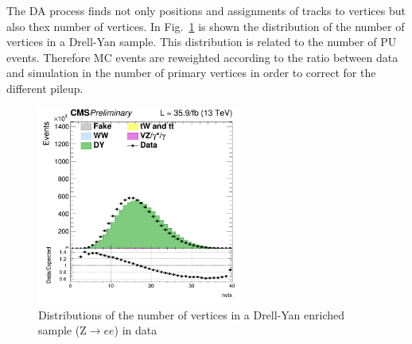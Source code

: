 The DA process finds not only positions and assignments of tracks to vertices but also thex number of vertices.
In Fig.~\ref{Fig:pu} is shown the distribution of the number of vertices in a Drell-Yan sample. This distribution is related to the number of PU events. Therefore MC events are reweighted according to the ratio between data and simulation in the number of primary vertices in order to correct for the different pileup. 
\begin{figure}[htbp]
\centering
\includegraphics[width=0.6\textwidth]{../AN/Figs/nvertices.png}
\caption{
    Distributions of the number of vertices in a Drell-Yan enriched sample
    (Z$\rightarrow{}ee$) in
    data}
    \label{Fig:pu}
\end{figure}




